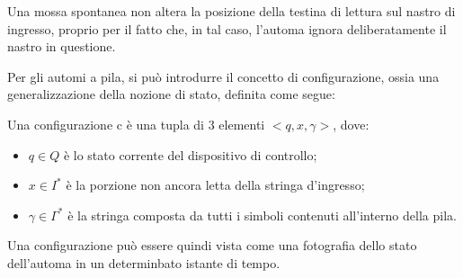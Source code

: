   Una mossa spontanea non altera la posizione della testina di lettura sul nastro di ingresso, proprio per il fatto che, in tal caso, l'automa ignora deliberatamente il nastro in questione.

  Per gli automi a pila, si può introdurre il concetto di configurazione, ossia una generalizzazione della nozione di stato, definita come segue:

  \begin{definition}
    Una configurazione c è una tupla di 3 elementi \(<q, x, \gamma>\), dove:
    \begin{itemize}
      \item \(q\in Q\) è lo stato corrente del dispositivo di controllo;
      \item \(x \in I^*\) è la porzione non ancora letta della stringa d'ingresso;
      \item \(\gamma \in \Gamma^*\) è la stringa composta da tutti i simboli contenuti all'interno della pila. 
    \end{itemize}
  \end{definition}
  Una configurazione può essere quindi vista come una fotografia dello stato dell'automa in un determinbato istante di tempo. 

